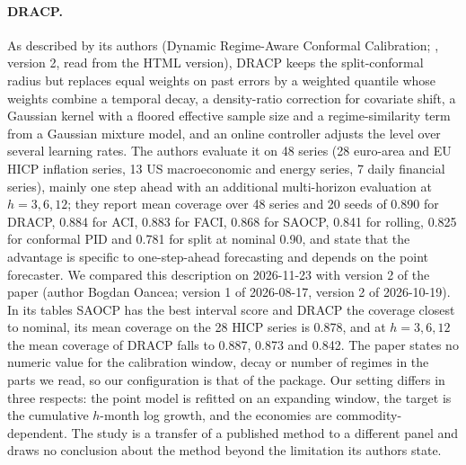 \paragraph{DRACP.} As described by its authors (Dynamic Regime-Aware Conformal Calibration; \citealp{oancea2026dracp}, version 2, read from the HTML version), DRACP keeps the split-conformal radius but replaces equal weights on past errors by a weighted quantile whose weights combine a temporal decay, a density-ratio correction for covariate shift, a Gaussian kernel with a floored effective sample size and a regime-similarity term from a Gaussian mixture model, and an online controller adjusts the level over several learning rates. The authors evaluate it on 48 series (28 euro-area and EU HICP inflation series, 13 US macroeconomic and energy series, 7 daily financial series), mainly one step ahead with an additional multi-horizon evaluation at $h=3,6,12$; they report mean coverage over 48 series and 20 seeds of 0.890 for DRACP, 0.884 for ACI, 0.883 for FACI, 0.868 for SAOCP, 0.841 for rolling, 0.825 for conformal PID and 0.781 for split at nominal 0.90, and state that the advantage is specific to one-step-ahead forecasting and depends on the point forecaster. We compared this description on 2026-11-23 with version 2 of the paper (author Bogdan Oancea; version 1 of 2026-08-17, version 2 of 2026-10-19). In its tables SAOCP has the best interval score and DRACP the coverage closest to nominal, its mean coverage on the 28 HICP series is 0.878, and at $h=3,6,12$ the mean coverage of DRACP falls to 0.887, 0.873 and 0.842. The paper states no numeric value for the calibration window, decay or number of regimes in the parts we read, so our configuration is that of the package. Our setting differs in three respects: the point model is refitted on an expanding window, the target is the cumulative $h$-month log growth, and the economies are commodity-dependent. The study is a transfer of a published method to a different panel and draws no conclusion about the method beyond the limitation its authors state.

